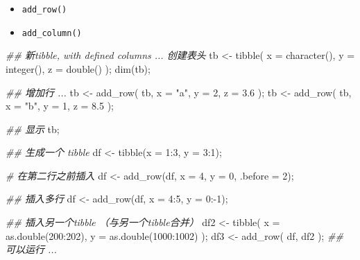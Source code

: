 \documentclass[
]{article}
\newenvironment{Shaded}{}{}
\newcommand{\AttributeTok}[1]{\textcolor[rgb]{0.49,0.56,0.16}{#1}}
\newcommand{\CommentTok}[1]{\textcolor[rgb]{0.38,0.63,0.69}{\textit{#1}}}
\newcommand{\DecValTok}[1]{\textcolor[rgb]{0.25,0.63,0.44}{#1}}
\newcommand{\DocumentationTok}[1]{\textcolor[rgb]{0.73,0.13,0.13}{\textit{#1}}}
\newcommand{\FloatTok}[1]{\textcolor[rgb]{0.25,0.63,0.44}{#1}}
\newcommand{\FunctionTok}[1]{\textcolor[rgb]{0.02,0.16,0.49}{#1}}
\newcommand{\NormalTok}[1]{#1}
\newcommand{\OtherTok}[1]{\textcolor[rgb]{0.00,0.44,0.13}{#1}}
\newcommand{\SpecialCharTok}[1]{\textcolor[rgb]{0.25,0.44,0.63}{#1}}
\newcommand{\StringTok}[1]{\textcolor[rgb]{0.25,0.44,0.63}{#1}}
\begin{document}
\begin{itemize}
\item
  \texttt{add\_row()}
\item
  \texttt{add\_column()}
\end{itemize}

\begin{Shaded}
\begin{Highlighting}[]
\DocumentationTok{\#\# 新tibble, with defined columns ... 创建表头 }
\NormalTok{tb }\OtherTok{\textless{}{-}} \FunctionTok{tibble}\NormalTok{( }\AttributeTok{x =} \FunctionTok{character}\NormalTok{(), }\AttributeTok{y =} \FunctionTok{integer}\NormalTok{(), }\AttributeTok{z =} \FunctionTok{double}\NormalTok{() );}
\FunctionTok{dim}\NormalTok{(tb);}

\DocumentationTok{\#\# 增加行 ... }
\NormalTok{tb }\OtherTok{\textless{}{-}} \FunctionTok{add\_row}\NormalTok{( tb, }\AttributeTok{x =} \StringTok{"a"}\NormalTok{, }\AttributeTok{y =} \DecValTok{2}\NormalTok{, }\AttributeTok{z =} \FloatTok{3.6}\NormalTok{  );}
\NormalTok{tb }\OtherTok{\textless{}{-}} \FunctionTok{add\_row}\NormalTok{( tb, }\AttributeTok{x =} \StringTok{"b"}\NormalTok{, }\AttributeTok{y =} \DecValTok{1}\NormalTok{, }\AttributeTok{z =} \FloatTok{8.5}\NormalTok{  );}

\DocumentationTok{\#\# 显示 }
\NormalTok{tb;}

\DocumentationTok{\#\# 生成一个 tibble }
\NormalTok{df }\OtherTok{\textless{}{-}} \FunctionTok{tibble}\NormalTok{(}\AttributeTok{x =} \DecValTok{1}\SpecialCharTok{:}\DecValTok{3}\NormalTok{, }\AttributeTok{y =} \DecValTok{3}\SpecialCharTok{:}\DecValTok{1}\NormalTok{);}

\CommentTok{\# 在第二行之前插入}
\NormalTok{df }\OtherTok{\textless{}{-}} \FunctionTok{add\_row}\NormalTok{(df, }\AttributeTok{x =} \DecValTok{4}\NormalTok{, }\AttributeTok{y =} \DecValTok{0}\NormalTok{, }\AttributeTok{.before =} \DecValTok{2}\NormalTok{);}

\DocumentationTok{\#\# 插入多行 }
\NormalTok{df }\OtherTok{\textless{}{-}} \FunctionTok{add\_row}\NormalTok{(df, }\AttributeTok{x =} \DecValTok{4}\SpecialCharTok{:}\DecValTok{5}\NormalTok{, }\AttributeTok{y =} \DecValTok{0}\SpecialCharTok{:{-}}\DecValTok{1}\NormalTok{);}

\DocumentationTok{\#\# 插入另一个tibble （与另一个tibble合并） }
\NormalTok{df2 }\OtherTok{\textless{}{-}} \FunctionTok{tibble}\NormalTok{( }\AttributeTok{x =} \FunctionTok{as.double}\NormalTok{(}\DecValTok{200}\SpecialCharTok{:}\DecValTok{202}\NormalTok{), }\AttributeTok{y =} \FunctionTok{as.double}\NormalTok{(}\DecValTok{1000}\SpecialCharTok{:}\DecValTok{1002}\NormalTok{) );}
\NormalTok{df3 }\OtherTok{\textless{}{-}} \FunctionTok{add\_row}\NormalTok{( df, df2 ); }\DocumentationTok{\#\# 可以运行 ... }


\end{Highlighting}
\end{Shaded}
\end{document}
